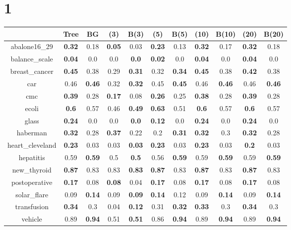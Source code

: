 \documentclass{article}%
\begin{document}
\section*{1}%
\begin{tabular}{c|cccccccccc}%
\hline%
&Tree&BG&(3)&B(3)&(5)&B(5)&(10)&B(10)&(20)&B(20)\\%
\hline%
abalone16\_29&\textbf{0.32}&0.18&\textbf{0.05}&0.03&\textbf{0.23}&0.13&\textbf{0.32}&0.17&\textbf{0.32}&0.18\\%
\hline%
balance\_scale&\textbf{0.04}&0.0&0.0&\textbf{0.0}&\textbf{0.02}&0.0&\textbf{0.04}&0.0&\textbf{0.04}&0.0\\%
\hline%
breast\_cancer&\textbf{0.45}&0.38&0.29&\textbf{0.31}&0.32&\textbf{0.34}&\textbf{0.45}&0.38&\textbf{0.42}&0.38\\%
\hline%
car&0.46&\textbf{0.46}&0.32&\textbf{0.32}&0.45&\textbf{0.45}&0.46&\textbf{0.46}&0.46&\textbf{0.46}\\%
\hline%
cmc&\textbf{0.39}&0.28&\textbf{0.17}&0.08&\textbf{0.26}&0.25&\textbf{0.38}&0.28&\textbf{0.39}&0.28\\%
\hline%
ecoli&\textbf{0.6}&0.57&0.46&\textbf{0.49}&\textbf{0.63}&0.51&\textbf{0.6}&0.57&\textbf{0.6}&0.57\\%
\hline%
glass&\textbf{0.24}&0.0&0.0&\textbf{0.0}&\textbf{0.12}&0.0&\textbf{0.24}&0.0&\textbf{0.24}&0.0\\%
\hline%
haberman&\textbf{0.32}&0.28&\textbf{0.37}&0.22&0.2&\textbf{0.31}&\textbf{0.32}&0.3&\textbf{0.32}&0.28\\%
\hline%
heart\_cleveland&\textbf{0.23}&0.03&0.03&\textbf{0.03}&\textbf{0.23}&0.03&\textbf{0.23}&0.03&\textbf{0.2}&0.03\\%
\hline%
hepatitis&0.59&\textbf{0.59}&0.5&\textbf{0.5}&0.56&\textbf{0.59}&0.59&\textbf{0.59}&0.59&\textbf{0.59}\\%
\hline%
new\_thyroid&\textbf{0.87}&0.83&0.83&\textbf{0.83}&\textbf{0.87}&0.83&\textbf{0.87}&0.83&\textbf{0.87}&0.83\\%
\hline%
postoperative&\textbf{0.17}&0.08&\textbf{0.08}&0.04&\textbf{0.17}&0.08&\textbf{0.17}&0.08&\textbf{0.17}&0.08\\%
\hline%
solar\_flare&0.09&\textbf{0.14}&0.09&\textbf{0.09}&\textbf{0.14}&0.12&0.09&\textbf{0.14}&0.09&\textbf{0.14}\\%
\hline%
transfusion&\textbf{0.34}&0.3&0.04&\textbf{0.12}&0.31&\textbf{0.32}&\textbf{0.33}&0.3&\textbf{0.34}&0.3\\%
\hline%
vehicle&0.89&\textbf{0.94}&0.51&\textbf{0.51}&0.86&\textbf{0.94}&0.89&\textbf{0.94}&0.89&\textbf{0.94}\\%

\end{tabular}
\end{document}
